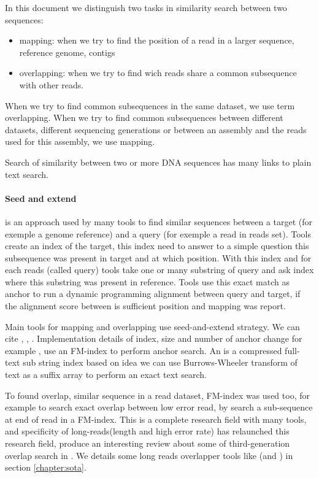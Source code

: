 \documentclass[main.tex]{subfiles}
\begin{document}
In this document we distinguish two tasks in similarity search between two sequences:
\begin{itemize}
    \item mapping: when we try to find the position of a read in a larger sequence, reference genome, contigs
    \item overlapping: when we try to find wich reads share a common subsequence with other reads. 
\end{itemize}
When we try to find common subsequences in the same dataset, we use term overlapping. When we try to find common subsequences between different datasets, different sequencing generations or between an assembly and the reads used for this assembly, we use mapping.

Search of similarity between two or more DNA sequences has many links to plain text search.

\paragraph{Seed and extend} is an approach used by many tools to find similar sequences between a target (for exemple a genome reference) and a query (for exemple a read in reads set). Tools create an index of the target, this index need to answer to a simple question this subsequence was present in target and at which position. With this index and for each reads (called query) tools take one or many substring of query and ask index where this substring was present in reference. Tools use this exact match as anchor to run a \citeauthor{smith_waterman}\cite{smith_waterman} dynamic programming alignment between query and target, if the alignment score between is sufficient position and mapping was report.

Main tools for mapping and overlapping use seed-and-extend strategy. We can cite  \cite{blast_one, blast_two},  \cite{bwa_mem},  \cite{blasr}. Implementation details of index, size and number of anchor change for example ,  use an FM-index \cite{fm-index} to perform anchor search. An is a compressed full-text sub string index based on idea we can use Burrows-Wheeler transform of text as a suffix array to perform an exact text search. 

To found overlap, similar sequence in a read dataset, FM-index was used too, for example  \cite{SGA} to search exact overlap between low error read, by search a sub-sequence at end of read in a FM-index. This is a complete research field with many tools, and specificity of long-reads(length and high error rate) has relaunched this research field, \citeauthor{ovl_bench} produce an interesting review about some of third-generation overlap search in \cite{ovl_bench}. We details some long reads overlapper tools like (\mhap and \minimap) in section \ref{chapter:sota}.
\end{document}
